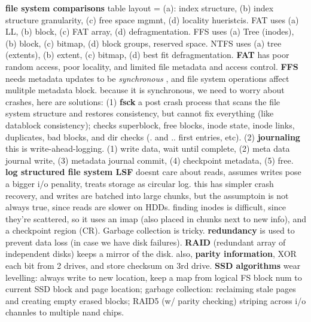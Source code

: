 
{\bf file system comparisons} table layout = (a): index structure, (b) index
structure granularity, (c) free space mgmnt, (d) locality hueristcis.  FAT uses
(a) LL, (b) block, (c) FAT array, (d) defragmentation.  FFS uses (a) Tree
(inodes), (b) block, (c) bitmap, (d) block groups, reserved space.  NTFS uses
(a) tree (extents), (b) extent, (c) bitmap, (d) best fit defragmentation.  {\bf
FAT} has poor random access, poor locality, and limited file metadata and
access control.  
{\bf FFS} needs metadata updates to be {\it synchronous }, and
file system operations affect mulitple metadata block.  because it is
synchronous, we need to worry about crashes, here are solutions: (1) {\bf fsck}
a post crash process that scans the file system structure and restores
consistency, but cannot fix everything (like datablock consistency); checks
superblock, free blocks, inode state, inode links, duplicates, bad blocks, and
dir checks (. and .. first entries, etc). (2) {\bf journaling} this is
write-ahead-logging. (1) write data, wait until complete, (2) meta data journal
write, (3) metadata journal commit, (4) checkpoint metadata, (5) free. 
{\bf log structured file system LSF} doesnt care about reads, assumes writes
pose a bigger i/o penality, treats storage as circular log. this has simpler
crash recovery, and writes are batched into large chunks, but the assumptoin is
not always true, since reads are slower on HDDs. finding inodes is difficult,
since they're scattered, so it uses an imap (also placed in chunks next to new
info), and a checkpoint region (CR). Garbage collection is tricky.  {\bf
redundancy} is used to prevent data loss (in case we have disk failures). {\bf
RAID} (redundant array of independent disks) keeps a mirror of the disk. also,
{\bf parity information}, XOR each bit from 2 drives, and store checksum on 3rd
drive.  {\bf SSD algorithms} wear levelling: always write to new location, keep
a map from logical FS block num to current SSD block and page location; garbage
collection: reclaiming stale pages and creating empty erased blocks; RAID5 (w/
parity checking) striping across i/o channles to multiple nand chips.

